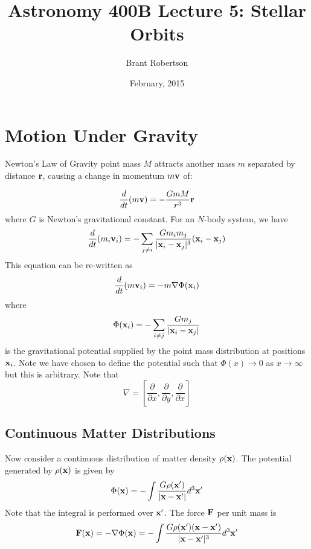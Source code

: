 \documentclass[]{article}
\title{Astronomy 400B Lecture 5: Stellar Orbits}
\author{Brant Robertson}
\date{February, 2015}
\begin{document}
\maketitle

\section{Motion Under Gravity}

Newton's Law of Gravity point mass $M$ attracts another mass $m$ separated by 
distance $\mathbf{r}$, causing a change in momentum $m\mathbf{v}$ of:

\begin{equation}
\frac{d}{dt}(m\mathbf{v}) = -\frac{GmM}{r^{3}} \mathbf{r}
\end{equation}
\noindent
where $G$ is Newton's gravitational constant. For an $N$-body system, we have
\begin{equation}
\frac{d}{dt}(m_{i}\mathbf{v}_{i}) = -\sum_{j\ne i}\frac{G m_{i} m_{j}}{|\mathbf{x}_i - \mathbf{x}_j|^{3}} (\mathbf{x}_i - \mathbf{x}_j)
\end{equation}
\noindent
This equation can be re-written as
\begin{equation}
\frac{d}{dt}(m \mathbf{v}_i) = - m \nabla\Phi(\mathbf{x}_i)
\end{equation}
\noindent
where
\begin{equation}
\Phi(\mathbf{x}_i) = - \sum_{i\ne j} \frac{G m_j}{|\mathbf{x}_i - \mathbf{x}_j|}
\end{equation}
\noindent
is the gravitational potential supplied by the point mass distribution at positions $\mathbf{x}_i$.
Note we have chosen to define the potential such that $\Phi(x)\to0$ as $x\to\infty$ but
this is arbitrary. Note that
\begin{equation}
\nabla = \left[\frac{\partial}{\partial x},\frac{\partial}{\partial y},\frac{\partial}{\partial x}\right]
\end{equation}

\subsection{Continuous Matter Distributions}
Now consider a continuous distribution of matter density $\rho(\mathbf{x})$.  The
potential generated by $\rho(\mathbf{x})$ is given by
\begin{equation}
\label{eqn:potential}
\Phi(\mathbf{x}) = - \int \frac{G\rho(\mathbf{x}')}{|\mathbf{x} - \mathbf{x}'|}d^{3}\mathbf{x}'
\end{equation}
\noindent
Note that the integral is performed over $\mathbf{x}'$.  The force $\mathbf{F}$ per unit mass
is
\begin{equation}
\mathbf{F}(\mathbf{x}) = - \nabla \Phi(\mathbf{x}) = - \int \frac{G\rho(\mathbf{x}')(\mathbf{x}-\mathbf{x}')}{|\mathbf{x}-\mathbf{x}'|^{3}}d^{3}\mathbf{x}'
\end{equation}
\end{document}

